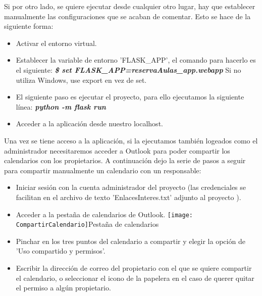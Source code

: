 Si por otro lado, se quiere ejecutar desde cualquier otro lugar, hay que establecer manualmente las configuraciones que se acaban de comentar. Esto se hace de la siguiente forma:
\begin{itemize}
    \item Activar el entorno virtual.
    \item Establecer la variable de entorno 'FLASK\_APP', el comando para hacerlo es el siguiente:\newline
    \textbf{\textit{\$ set FLASK\_APP=reservaAulas\_app.webapp}}\newline
    Si no utiliza Windows, use export en vez de set.
    \item El siguiente paso es ejecutar el proyecto, para ello ejecutamos la siguiente línea:\newline
    \textbf{\textit{python -m flask run}}
    \item Acceder a la aplicación desde nuestro localhost.
\end{itemize}
Una vez se tiene acceso a la aplicación, si la ejecutamos también logeados como el administrador necesitaremos acceder a Outlook para poder compartir los calendarios con los propietarios. A continuación dejo la serie de pasos a seguir para compartir manualmente un calendario con un responsable:
\begin{itemize}
    \item Iniciar sesión con la cuenta administrador del proyecto (las credenciales se facilitan en el archivo de texto 'EnlacesInteres.txt' adjunto al proyecto ).
    \item Acceder a la pestaña de calendarios de Outlook. \newline
   \texttt{[image: CompartirCalendario]}{Pestaña de calendarios}
    \item Pinchar en los tres puntos del calendario a compartir y elegir la opción de 'Uso compartido y permisos'.\newline
    \item Escribir la dirección de correo del propietario con el que se quiere compartir el calendario, o seleccionar el icono de la papelera en el caso de querer quitar el permiso a algún propietario.\newline
\end{itemize}
